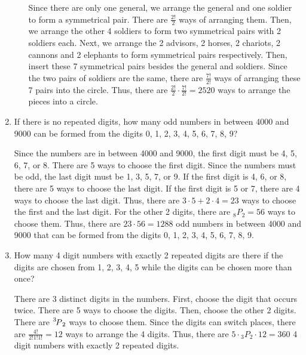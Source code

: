 \documentclass{report}
\newcommand\perm[2][^n]{\prescript{#1\mkern-2.5mu}{}P_{#2}}
\newcommand\permtwo[2][^n]{{}_{#1}P_{#2}}
\begin{document}
\begin{multicols}{2}
\begin{enumerate}
\begin{enumerate}
                  Since there are only one general, we arrange the general and one soldier to
                  form a symmetrical pair. There are $\frac{2!}{2}$ ways of arranging them. Then,
                  we arrange the other 4 soldiers to form two symmetrical pairs with 2 soldiers
                  each. Next, we arrange the 2 advisors, 2 horses, 2 chariots, 2 cannons and 2
                  elephants to form symmetrical pairs respectively. Then, insert these 7
                  symmetrical pairs besides the general and soldiers. Since the two pairs of
                  soldiers are the same, there are $\frac{7!}{2!}$ ways of arranging these 7
                  pairs into the circle. Thus, there are $\frac{2!}{2} \cdot \frac{7!}{2!} =
                    2520$ ways to arrange the pieces into a circle.
          \end{enumerate}

    \item If there is no repeated digits, how many odd numbers in between 4000 and 9000
          can be formed from the digits 0, 1, 2, 3, 4, 5, 6, 7, 8, 9? \sol{}

          Since the numbers are in between 4000 and 9000, the first digit must be 4, 5,
          6, 7, or 8. There are 5 ways to choose the first digit. Since the numbers must
          be odd, the last digit must be 1, 3, 5, 7, or 9. If the first digit is 4, 6, or
          8, there are 5 ways to choose the last digit. If the first digit is 5 or 7,
          there are 4 ways to choose the last digit. Thus, there are $3 \cdot 5 + 2 \cdot
            4 = 23$ ways to choose the first and the last digit. For the other 2 digits,
          there are $\permtwo[8]{2} = 56$ ways to choose them. Thus, there are $23 \cdot
            56 = 1288$ odd numbers in between 4000 and 9000 that can be formed from the
          digits 0, 1, 2, 3, 4, 5, 6, 7, 8, 9.

    \item How many 4 digit numbers with exactly 2 repeated digits are there if the digits
          are chosen from 1, 2, 3, 4, 5 while the digits can be chosen more than once?
          \sol{}

          There are 3 distinct digits in the numbers. First, choose the digit that occurs
          twice. There are 5 ways to choose the digits. Then, choose the other 2 digits.
          There are $\perm[3]{2}$ ways to choose them. Since the digits can switch
          places, there are $\frac{4!}{2!1!1!} = 12$ ways to arrange the 4 digits. Thus,
          there are $5 \cdot \permtwo[3]{2} \cdot 12 = 360$ 4 digit numbers with exactly
          2 repeated digits.


\end{enumerate}
\end{multicols}
\end{document}
